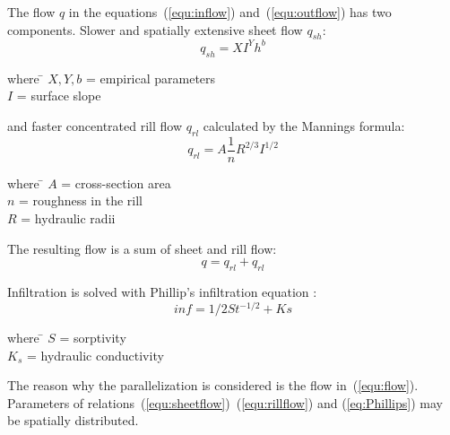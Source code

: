 The flow $q$ in the equations~(\ref{equ:inflow}) and~(\ref{equ:outflow})
has two components. Slower and spatially extensive sheet flow
$q_{sh}$:
\begin{equation}\label{equ:sheetflow}
    q_{sh} = XI^Yh^b
\end{equation}
\begin{tabbing} 
where \hspace{0.6cm} \= $X,Y,b$ = empirical parameters\\
\> $I$ = surface slope
\end{tabbing}
and faster concentrated rill flow $q_{rl}$ calculated by the Mannings formula:
\begin{equation}\label{equ:rillflow}
    q_{rl} = A\frac{1}{n} R^{2/3} I^{1/2}
\end{equation}
\begin{tabbing} 
where \hspace{0.6cm} \= $A$ = cross-section area\\
\> $n$ = roughness in the rill\\
\> $R$ = hydraulic radii
\end{tabbing}
The resulting flow is a sum of sheet and rill flow:
\begin{equation}\label{equ:flow}
    q = q_{rl} + q_{rl}
\end{equation}

Infiltration is solved with Phillip's infiltration equation \cite{philip1957theory}:
\begin{equation}\label{eq:Phillips}
    inf = 1/2St^{-1/2} + Ks
\end{equation}
\begin{tabbing} 
where \hspace{0.6cm} \= $S$ = sorptivity\\
\> $K_s$ = hydraulic conductivity
\end{tabbing}

The reason why the parallelization is considered is the flow
in~(\ref{equ:flow}). Parameters of
relations~(\ref{equ:sheetflow})~(\ref{equ:rillflow}) and
(\ref{eq:Phillips}) may be spatially distributed.

